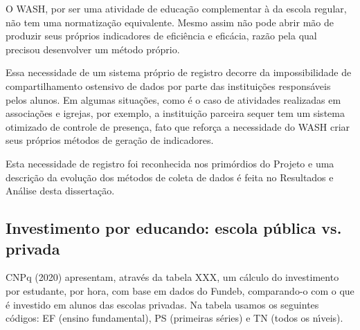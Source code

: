 \documentclass[
12pt,		%
openright,	%
twoside,  %
a4paper,			%
chapter=TITLE,		%
english,			%
french,				%
spanish,			%
brazil				%
]{USPSC-classe/USPSC}
\begin{document}
O WASH, por ser uma atividade de educa\c{c}\~ao complementar \`a da escola regular, n\~ao tem uma normatiza\c{c}\~ao equivalente. Mesmo assim n\~ao pode abrir m\~ao de produzir seus pr\'oprios indicadores de efici\^encia e efic\'acia, raz\~ao pela qual  precisou desenvolver um m\'etodo pr\'oprio.

















Essa necessidade de um sistema pr\'oprio de registro decorre da impossibilidade de compartilhamento ostensivo de dados por parte das institui\c{c}\~oes respons\'aveis pelos alunos. Em algumas situa\c{c}\~oes, como \'e o caso de atividades realizadas em associa\c{c}\~oes e igrejas, por exemplo, a institui\c{c}\~ao parceira sequer tem um sistema otimizado de controle de presen\c{c}a, fato que refor\c{c}a a necessidade do WASH criar seus pr\'oprios m\'etodos de gera\c{c}\~ao de indicadores.

















Esta necessidade de registro foi reconhecida nos prim\'ordios do Projeto e uma descri\c{c}\~ao da evolu\c{c}\~ao dos m\'etodos de coleta de dados \'e feita no Resultados e An\'alise desta disserta\c{c}\~ao.

















\subsection[Investimento por educando: escola p\'ublica vs. privada]{Investimento por educando: escola p\'ublica vs. privada}\label{Investimento por educando: escola p\'ublica vs. privada}
CNPq (2020)  apresentam, atrav\'es da tabela XXX, um c\'alculo do investimento por estudante, por hora, com base em dados do Fundeb, comparando-o com o que \'e investido em alunos das escolas privadas. Na tabela usamos os seguintes c\'odigos: EF (ensino fundamental), PS (primeiras s\'eries) e TN (todos os n\'{\i}veis).
\end{document}
